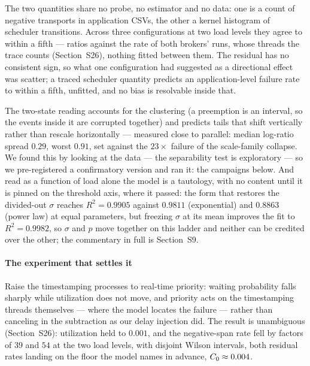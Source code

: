 \documentclass[10pt,journal,onecolumn]{IEEEtran}
\begin{document}
The two quantities share no probe, no estimator and no data: one is a count of negative
transports in application CSVs, the other a kernel histogram of scheduler transitions. Across
three configurations at two load levels they agree to within a fifth --- ratios
\tracedPooledRatios{} against the rate of both brokers' runs, whose threads the trace counts
(Section~S26), nothing fitted between them. The residual has no consistent sign, so what one
configuration had suggested as a directional effect was scatter; a traced scheduler quantity
predicts an application-level failure rate to within a fifth, unfitted, and no bias is
resolvable inside that.


The two-state reading accounts for the clustering (a preemption is an interval, so the
events inside it are corrupted together) and predicts tails that shift vertically rather
than rescale horizontally --- measured close to parallel: median log-ratio spread $0.29$,
worst $0.91$, set against the $23\times$ failure of the scale-family collapse. We found
this by looking at the data --- the separability test is exploratory --- so we
pre-registered a confirmatory version and ran it: the campaigns below. And read as a
function of load alone the model is a tautology, with no content until it is pinned on the
threshold axis, where it passed: the form that restores the divided-out $\sigma$ reaches
$R^2 = 0.9905$ against $0.9811$ (exponential) and $0.8863$ (power law) at equal parameters,
but freezing $\sigma$ at its mean improves the fit to $R^2 = 0.9982$, so $\sigma$ and $p$
move together on this ladder and neither can be credited over the other; the commentary in
full is Section~S9.

\paragraph{The experiment that settles it} Raise the timestamping processes to real-time
priority: waiting probability falls sharply while utilization does not move, and priority acts on the
timestamping threads themselves --- where the model locates the failure --- rather than
canceling in the subtraction as our delay injection did. The result is unambiguous
(Section~S26): utilization held to $0.001$, and the negative-span rate fell by
factors of $39$ and $54$ at the two load levels, with disjoint Wilson intervals, both
residual rates landing on the floor the model names in advance, $C_0 \approx 0.004$.
\end{document}
